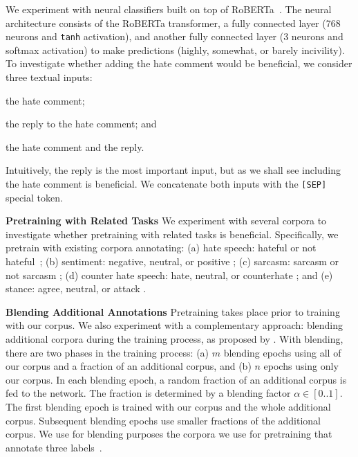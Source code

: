 \documentclass[11pt]{article}
\begin{document}
	We experiment with neural classifiers built on top of RoBERTa~\cite{DBLP:journals/corr/abs-1907-11692}. 
	The neural architecture consists of the RoBERTa transformer, 
	a fully connected layer (768 neurons and \texttt{tanh} activation), 
	and 
	another fully connected layer (3 neurons and softmax activation) to make predictions (highly, somewhat, or barely incivility). 
	To investigate whether adding the hate comment would be beneficial, we consider three textual inputs:
	\begin{compactitem}
		\item the hate comment;
		\item the reply to the hate comment; and
		\item the hate comment and the reply.
	\end{compactitem}
	
	Intuitively, the reply is the most important input, but as we shall see including the hate comment is beneficial.
	We concatenate both inputs with the \texttt{[SEP]} special token. 
	
	\noindent
	\textbf{Pretraining with Related Tasks} 
	We experiment with several corpora to investigate whether pretraining with related tasks is beneficial. 
	Specifically, we pretrain with existing corpora annotating: 
	(a) hate speech: hateful or not hateful~\cite{hateoffensive}; 
	(b) sentiment: negative, neutral, or positive \cite{rosenthal-etal-2017-semeval}; 
	(c) sarcasm: sarcasm or not sarcasm \cite{ghosh-etal-2020-report}; 
	(d) counter hate speech: hate, neutral, or counterhate \cite{yu-etal-2022-hate}; and
	(e) stance: agree, neutral, or attack \cite{pougubiyong2021debagreement}.
	

	
	\noindent
	\textbf{Blending Additional Annotations}
	Pretraining takes place prior to training with our corpus.
	We also experiment with a complementary approach: blending additional corpora during the training process, as proposed by \citet{shnarch-etal-2018-will}.
	With blending, there are two phases in the training process: 
	(a) $\mathit{m}$ blending epochs using all of our corpus and a fraction of an additional corpus,
	and
	(b) $\mathit{n}$ epochs using only our corpus. 
	In each blending epoch, a random fraction of an additional corpus is fed to the network.
	The fraction is determined by a blending factor $\alpha \in [0..1]$. 
	The first blending epoch is trained with our corpus and the whole additional corpus.
	Subsequent blending epochs use smaller fractions of the additional corpus.
	We use for blending purposes the corpora we use for pretraining that annotate three labels~\cite{rosenthal-etal-2017-semeval,pougubiyong2021debagreement,yu-etal-2022-hate}.
\end{document}

